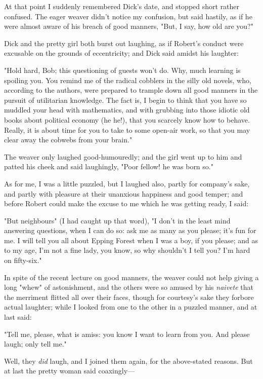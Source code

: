 At that point I suddenly remembered Dick's date, and stopped short
rather confused. The eager weaver didn't notice my confusion, but said
hastily, as if he were almost aware of his breach of good manners, "But,
I say, how old are you?"

Dick and the pretty girl both burst out laughing, as if Robert's conduct
were excusable on the grounds of eccentricity; and Dick said amidst his
laughter:

"Hold hard, Bob; this questioning of guests won't do. Why, much learning
is spoiling you. You remind me of the radical cobblers in the silly old
novels, who, according to the authors, were prepared to trample down all
good manners in the pursuit of utilitarian knowledge. The fact is, I
begin to think that you have so muddled your head with mathematics, and
with grubbing into those idiotic old books about political economy (he
he!), that you scarcely know how to behave. Really, it is about time for
you to take to some open-air work, so that you may clear away the
cobwebs from your brain."

The weaver only laughed good-humouredly; and the girl went up to him and
patted his cheek and said laughingly, "Poor fellow! he was born so."

As for me, I was a little puzzled, but I laughed also, partly for
company's sake, and partly with pleasure at their unanxious happiness
and good temper; and before Robert could make the excuse to me which he
was getting ready, I said:

"But neighbours" (I had caught up that word), "I don't in the least mind
answering questions, when I can do so: ask me as many as you please;
it's fun for me. I will tell you all about Epping Forest when I was a
boy, if you please; and as to my age, I'm not a fine lady, you know, so
why shouldn't I tell you? I'm hard on fifty-six."

In spite of the recent lecture on good manners, the weaver could not
help giving a long "whew" of astonishment, and the others were so amused
by his \emph{naivete} that the merriment flitted all over their faces,
though for courtesy's sake they forbore actual laughter; while I looked
from one to the other in a puzzled manner, and at last said:

"Tell me, please, what is amiss: you know I want to learn from you. And
please laugh; only tell me."

Well, they \emph{did} laugh, and I joined them again, for the
above-stated reasons. But at last the pretty woman said coaxingly---

